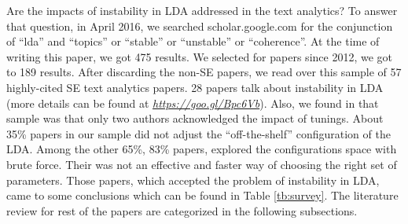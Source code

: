 \documentclass[conference]{IEEEtran}
\theoremstyle{break}
\begin{document}
Are the impacts of instability in LDA addressed in the text analytics? To answer that question, in April 2016, we searched scholar.google.com for the conjunction of “lda” and “topics” or “stable” or “unstable” or “coherence”. At the time of writing this paper, we got 475 results. We selected for papers since 2012, we got to 189 results. After discarding the non-SE papers, we read over this sample of 57 highly-cited SE text analytics papers. 28 papers talk about instability in LDA (more details can be found at \href{https://goo.gl/Bpc6Vb}{\textit{https://goo.gl/Bpc6Vb}}). Also, we found in that sample was that only two authors acknowledged the impact of tunings. About 35\% papers in our sample did not adjust the “off-the-shelf” configuration of the LDA. Among the other 65\%, 83\% papers, explored the configurations space with brute force. Their was not an effective and faster way of choosing the right set of parameters. Those papers, which accepted the problem of instability in LDA, came to some conclusions which can be found in Table \ref{tb:survey}. The literature review for rest of the papers are categorized in the following subsections.
\end{document}
